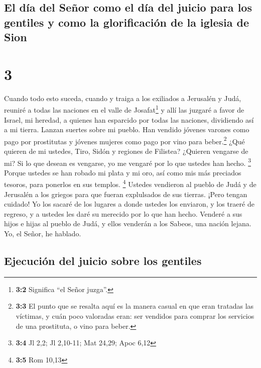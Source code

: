 \hypertarget{el-duxeda-del-seuxf1or-como-el-duxeda-del-juicio-para-los-gentiles-y-como-la-glorificaciuxf3n-de-la-iglesia-de-sion}{%
\subsection{El día del Señor como el día del juicio para los gentiles y
como la glorificación de la iglesia de
Sion}\label{el-duxeda-del-seuxf1or-como-el-duxeda-del-juicio-para-los-gentiles-y-como-la-glorificaciuxf3n-de-la-iglesia-de-sion}}

\hypertarget{section-2}{%
\section{3}\label{section-2}}

 Cuando todo esto suceda, cuando y traiga a los exiliados
a Jerusalén y Judá,  reuniré a todas las naciones en el
valle de Josafat\footnote{\textbf{3:2} Significa ``el Señor juzga''.} y
allí las juzgaré a favor de Israel, mi heredad, a quienes han esparcido
por todas las naciones, dividiendo así a mi tierra. 
Lanzan suertes sobre mi pueblo. Han vendido jóvenes varones como pago
por prostitutas y jóvenes mujeres como pago por vino para
beber.\footnote{\textbf{3:3} El punto que se resalta aquí es la manera
  casual en que eran tratadas las víctimas, y cuán poco valoradas eran:
  ser vendidos para comprar los servicios de una prostituta, o vino para
  beber.}  ¿Qué quieren de mi ustedes, Tiro, Sidón y
regiones de Filistea? ¿Quieren vengarse de mi? Si lo que desean es
vengarse, yo me vengaré por lo que ustedes han hecho. \footnote{\textbf{3:4}
  Jl 2,2; Jl 2,10-11; Mat 24,29; Apoc 6,12}  Porque
ustedes se han robado mi plata y mi oro, así como mis más preciados
tesoros, para ponerlos en sus templos. \footnote{\textbf{3:5} Rom 10,13}
 Ustedes vendieron al pueblo de Judá y de Jerusalén a los
griegos para que fueran explulsados de sus tierras.  ¡Pero
tengan cuidado! Yo los sacaré de los lugares a donde ustedes los
enviaron, y los traeré de regreso, y a ustedes les daré su merecido por
lo que han hecho.  Venderé a sus hijos e hijas al pueblo
de Judá, y ellos venderán a los Sabeos, una nación lejana. Yo, el Señor,
he hablado.

\hypertarget{ejecuciuxf3n-del-juicio-sobre-los-gentiles}{%
\subsection{Ejecución del juicio sobre los
gentiles}\label{ejecuciuxf3n-del-juicio-sobre-los-gentiles}}

